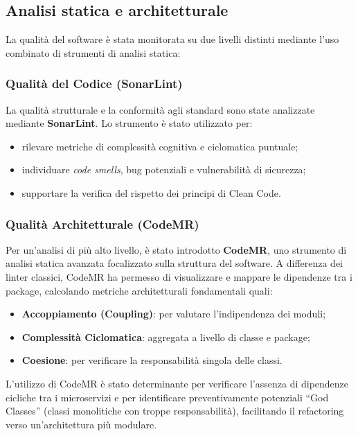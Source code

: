 \subsection{Analisi statica e architetturale}

La qualità del software è stata monitorata su due livelli distinti mediante l'uso combinato di strumenti di analisi statica:

\subsubsection{Qualità del Codice (SonarLint)}
La qualità strutturale e la conformità agli standard sono state analizzate mediante \textbf{SonarLint}. Lo strumento è stato utilizzato per:
\begin{itemize}
    \item rilevare metriche di complessità cognitiva e ciclomatica puntuale;
    \item individuare \textit{code smells}, bug potenziali e vulnerabilità di sicurezza;
    \item supportare la verifica del rispetto dei principi di Clean Code.
\end{itemize}

\subsubsection{Qualità Architetturale (CodeMR)}
Per un'analisi di più alto livello, è stato introdotto \textbf{CodeMR}, uno strumento di analisi statica avanzata focalizzato sulla struttura del software.
A differenza dei linter classici, CodeMR ha permesso di visualizzare e mappare le dipendenze tra i package, calcolando metriche architetturali fondamentali quali:
\begin{itemize}
    \item \textbf{Accoppiamento (Coupling)}: per valutare l'indipendenza dei moduli;
    \item \textbf{Complessità Ciclomatica}: aggregata a livello di classe e package;
    \item \textbf{Coesione}: per verificare la responsabilità singola delle classi.
\end{itemize}
L'utilizzo di CodeMR è stato determinante per verificare l'assenza di dipendenze cicliche tra i microservizi e per identificare preventivamente potenziali ``God Classes'' (classi monolitiche con troppe responsabilità), facilitando il refactoring verso un'architettura più modulare.


